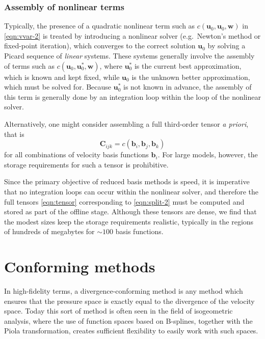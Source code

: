 \documentclass[onecolumn, twoside, a4paper, 11pt]{article}
\begin{document}
\subsubsection{Assembly of nonlinear terms}

Typically, the presence of a quadratic nonlinear term such as $c(\bm u_0, \bm u_0, \bm w)$ in
\eqref{eqn:vvar-2} is treated by introducing a nonlinear solver (e.g.~Newton's method or fixed-point
iteration), which converges to the correct solution $\bm u_0$ by solving a Picard sequence of
\emph{linear} systems. These systems generally involve the assembly of terms such as $c(\bm u_0, \bm
u_0^*, \bm w)$, where $\bm u_0^*$ is the current best approximation, which is known and kept fixed,
while $\bm u_0$ is the unknown better approximation, which must be solved for. Because $\bm u_0^*$
is not known in advance, the assembly of this term is generally done by an integration loop within
the loop of the nonlinear solver.

Alternatively, one might consider assembling a full third-order tensor
\emph{a priori}, that is
\begin{equation}
  \bm C_{ijk} = c(\bm b_i, \bm b_j, \bm b_k)
  \label{eqn:tensor}
\end{equation}
for all combinations of velocity basis functions $\bm b_i$. For large models,
however, the storage requirements for such a tensor is prohibitive.

Since the primary objective of reduced basis methods is speed, it is imperative
that no integration loops can occur within the nonlinear solver, and therefore
the full tensors \eqref{eqn:tensor} corresponding to \eqref{eqn:split-2} must be
computed and stored as part of the offline stage. Although these tensors are
dense, we find that the modest sizes keep the storage requirements realistic,
typically in the regions of hundreds of megabytes for $\sim100$ basis
functions.

\section{Conforming methods}
\label{sec:conforming}

In high-fidelity terms, a divergence-conforming method is any method which
ensures that the pressure space is exactly equal to the divergence of the
velocity space. Today this sort of method is often seen in the field of
isogeometric analysis, where the use of function spaces based on B-splines,
together with the Piola transformation, creates sufficient flexibility to easily
work with such spaces.
\end{document}
